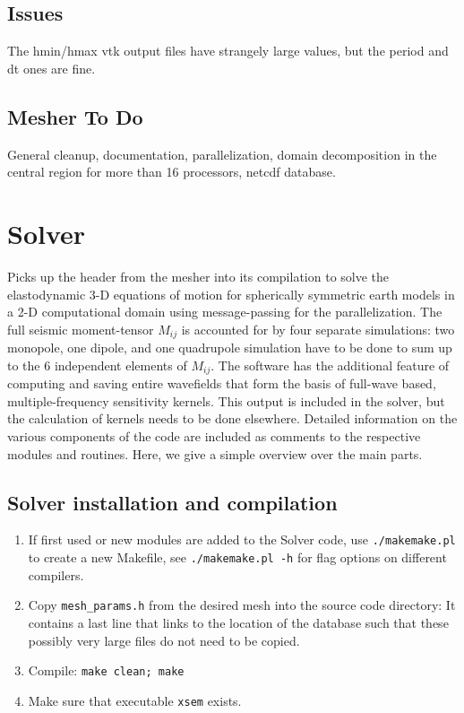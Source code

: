 \documentclass[11pt,letter,fleqn,english,notitlepage]{article}
\begin{document}
\subsection{Issues}
The hmin/hmax vtk output files have strangely large values, but the period and dt ones are fine.

\subsection{Mesher To Do}
General cleanup, documentation, parallelization, domain decomposition in the central region for 
more than 16 processors, netcdf database.

\newpage
\section{Solver}
Picks up the header from the mesher into its compilation to solve 
the elastodynamic 3-D equations of motion for spherically symmetric 
earth models in a 2-D computational domain using message-passing for the 
parallelization. The full seismic moment-tensor $M_{ij}$ is accounted for by four
separate simulations: two monopole, one dipole, and one quadrupole 
simulation have to be done to sum up to the 6 independent elements of $M_{ij}$.
The software has the additional feature of computing and 
saving entire wavefields that form the basis of full-wave based, 
multiple-frequency sensitivity kernels. This output is included in the 
solver, but the calculation of kernels needs to be done elsewhere. 
Detailed information on the various components of the code are included as 
comments to the respective modules and routines. 
Here, we give a simple overview over the main parts. 
\newpage
\subsection{Solver installation and compilation}
\begin{enumerate}
\item If first used or new modules are added to the Solver code,
use {\tt ./makemake.pl } to create a new Makefile, see {\tt ./makemake.pl -h} for 
flag options on different compilers.
\item Copy {\tt mesh\_params.h} from the desired mesh into the source code directory: 
It contains a last line that links to the location of the database such that 
these possibly very large files do not need to be copied.
\item Compile: {\tt make clean; make}
\item Make sure that executable {\tt xsem} exists.
\end{enumerate}
\end{document}
